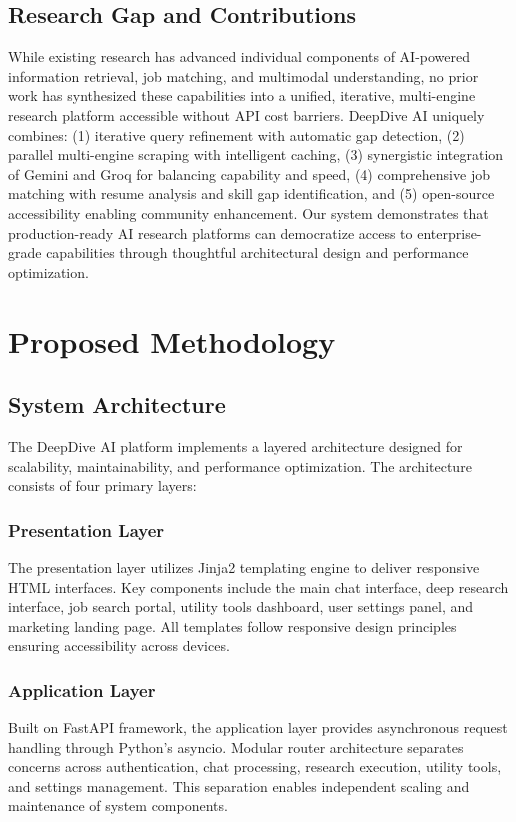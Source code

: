 \documentclass[conference]{IEEEtran}
\begin{document}
\subsection{Research Gap and Contributions}

While existing research has advanced individual components of AI-powered information retrieval, job matching, and multimodal understanding, no prior work has synthesized these capabilities into a unified, iterative, multi-engine research platform accessible without API cost barriers. DeepDive AI uniquely combines: (1) iterative query refinement with automatic gap detection, (2) parallel multi-engine scraping with intelligent caching, (3) synergistic integration of Gemini and Groq for balancing capability and speed, (4) comprehensive job matching with resume analysis and skill gap identification, and (5) open-source accessibility enabling community enhancement. Our system demonstrates that production-ready AI research platforms can democratize access to enterprise-grade capabilities through thoughtful architectural design and performance optimization.

\section{Proposed Methodology}

\subsection{System Architecture}

The DeepDive AI platform implements a layered architecture designed for scalability, maintainability, and performance optimization. The architecture consists of four primary layers:

\subsubsection{Presentation Layer}
The presentation layer utilizes Jinja2 templating engine to deliver responsive HTML interfaces. Key components include the main chat interface, deep research interface, job search portal, utility tools dashboard, user settings panel, and marketing landing page. All templates follow responsive design principles ensuring accessibility across devices.

\subsubsection{Application Layer}
Built on FastAPI framework, the application layer provides asynchronous request handling through Python's asyncio. Modular router architecture separates concerns across authentication, chat processing, research execution, utility tools, and settings management. This separation enables independent scaling and maintenance of system components.
\end{document}
